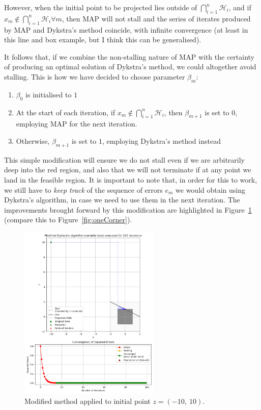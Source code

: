 \documentclass[hidelinks]{article}
\begin{document}
%
\newpage
However, when the initial point to be projected lies outside of $\bigcap_{i=1}^n \mathcal{H}_i$, and if $x_m \notin \bigcap_{i=1}^n \mathcal{H}_i \forall m$, then MAP will not stall and the series of iterates produced by MAP and Dykstra's method coincide, with infinite convergence (at least in this line and box example, but I think this can be generalised).
\par It follows that, if we combine the non-stalling nature of MAP with the certainty of producing an optimal solution of Dykstra's method, we could altogether avoid stalling. This is how we have decided to choose parameter $\beta_m$:
%
\begin{enumerate}
\item $\beta_0$ is initialised to $1$
\item At the start of each iteration, if $x_m \notin \bigcap_{i=1}^n \mathcal{H}_i$, then $\beta_{m+1}$ is set to $0$, employing MAP for the next iteration.
\item Otherwise, $\beta_{m+1}$ is set to $1$, employing Dykstra's method instead
\end{enumerate}
%
\par This simple modification will ensure we do not stall even if we are arbitrarily deep into the red region, and also that we will not terminate if at any point we land in the feasible region. It is important to note that, in order for this to work, we still have to \textit{keep track} of the sequence of errors $e_m$ we would obtain using Dykstra's algorithm, in case we need to use them in the next iteration. The improvements brought forward by this modification are highlighted in Figure~\ref{fig:oneCornerModified} (compare this to Figure~\ref{fig:oneCorner}).
%
\begin{figure}[h!]
    \centering
    
    \includegraphics[width=0.6\textwidth]{Latex/Current Version/Figures/not_in_intersection_modified.png}
    \caption{Modified method applied to initial point $z = (-10,~10)$.}
    \label{fig:oneCornerModified}

\end{figure}
\end{document}
